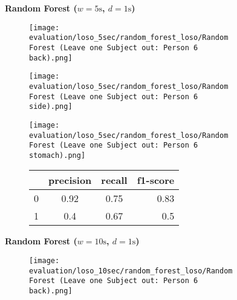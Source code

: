 \begin{figure}[ht]
  \textbf{Random Forest ($w=5\si{\s}$, $d=1\si{\s}$)}
    \centering
    \begin{subfigure}{1\textwidth}
        \texttt{[image: evaluation/loso\_5sec/random\_forest\_loso/Random Forest (Leave one Subject out: Person 6 back).png]}
      \end{subfigure}
      \begin{subfigure}{1\textwidth}
        \texttt{[image: evaluation/loso\_5sec/random\_forest\_loso/Random Forest (Leave one Subject out: Person 6 side).png]}
      \end{subfigure}
      \begin{subfigure}{1\textwidth}
        \texttt{[image: evaluation/loso\_5sec/random\_forest\_loso/Random Forest (Leave one Subject out: Person 6 stomach).png]}
    \end{subfigure}
    \begin{subfigure}{1\textwidth}
        \begin{center}
            \begin{tabular}{ | l | c | c | r | }
              \hline
               & precision & recall & f1-score\\ \hline
              0 & 0.92 & 0.75 & 0.83 \\ \hline
              1 & 0.4  & 0.67 & 0.5 \\
              \hline
            \end{tabular}
        \end{center}
    \end{subfigure}
    \newline
    \vspace*{1 cm}
    \newline
    \textbf{Random Forest ($w=10\si{\s}$, $d=1\si{\s}$)}
    \begin{subfigure}{1\textwidth}
      \texttt{[image: evaluation/loso\_10sec/random\_forest\_loso/Random Forest (Leave one Subject out: Person 6 back).png]}

\end{subfigure}
\end{figure}
